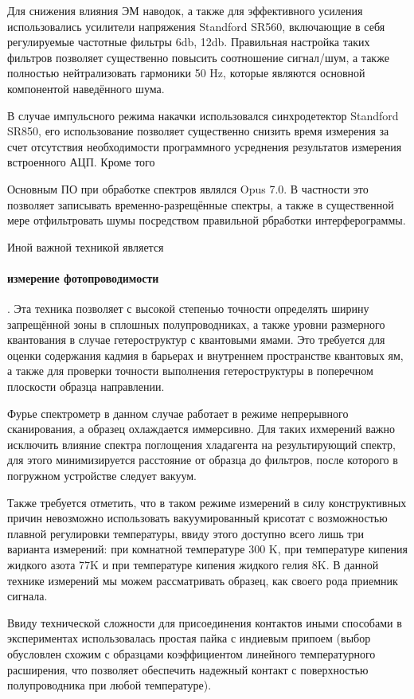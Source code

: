     Для снижения влияния ЭМ наводок, а также для эффективного усиления использовались 
    усилители напряжения Standford SR560, включающие в себя регулируемые частотные фильтры 6db, 12db. 
    Правильная настройка таких фильтров позволяет существенно повысить соотношение сигнал/шум, 
    а также полностью нейтрализовать гармоники 50 Hz, которые являются основной компонентой наведённого шума.

    В случае импульсного режима накачки использовался синхродетектор Standford SR850, его использование
    позволяет существенно снизить время измерения за счет отсутствия необходимости программного усреднения 
    результатов измерения встроенного АЦП. Кроме того

    Основным ПО при обработке спектров являлся Opus 7.0. В частности это позволяет записывать временно-разрещённые спектры,
    а также в существенной мере отфильтровать шумы посредством правильной рбработки интерферограммы.

    Иной важной техникой является \paragraph{измерение фотопроводимости}. Эта техника позволяет с высокой степенью точности
    определять ширину запрещённой зоны в сплошных полупроводниках, а также уровни размерного квантования в случае гетероструктур
    с квантовыми ямами. Это требуется для оценки содержания кадмия в барьерах и внутреннем пространстве квантовых ям, а также
    для проверки точности выполнения гетероструктуры в поперечном плоскости образца направлении.

    Фурье спектрометр в данном случае работает в режиме непрерывного сканирования, а образец охлаждается иммерсивно.
    Для таких ихмерений важно исключить влияние спектра поглощения хладагента на результирующий спектр, для этого
    минимизируется расстояние от образца до фильтров, после которого в погружном устройстве следует вакуум.
    
    Также требуется отметить, что в таком режиме измерений в силу конструктивных причин невозможно использовать вакуумированный
    крисотат с возможностью плавной регулировки температуры, ввиду этого доступно всего лишь три варианта измерений:
    при комнатной температуре 300 K, при температуре кипения жидкого азота 77K и при температуре кипения жидкого гелия 8K. В
    данной технике измерений мы можем рассматривать образец, как своего рода приемник сигнала. 
    
    Ввиду технической сложности для присоединения контактов иными способами в экспериментах использовалась простая пайка
    с индиевым припоем (выбор обусловлен схожим с образцами коэффициентом линейного температурного расширения, что позволяет 
    обеспечить надежный контакт с поверхностью полупроводника при любой температуре).

